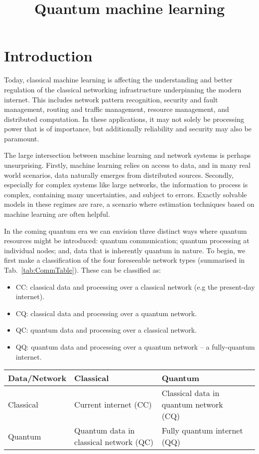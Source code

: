 \documentclass[twocolumn, aps, rmp, amsmath, amssymb, nofootinbib, superscriptaddress, longbibliography, floatfix, table-of-contents, eqsecnum]{revtex4}
\title{Quantum machine learning}\index{Quantum machine learning}\index{Machine learning}
\newcommand{\captionspacetab}[0]{\vspace{-0.6em}}
\begin{document}
\maketitle

\tableofcontents 

\section{Introduction}

Today, classical machine learning is affecting the understanding and better regulation of the classical networking infrastructure underpinning the modern internet. This includes network pattern recognition, security and fault management, routing and traffic management, resource management, and distributed computation. In these applications, it may not solely be processing power that is of importance, but additionally reliability and security may also be paramount.

The large intersection between machine learning and network systems is perhaps unsurprising. Firstly, machine learning relies on access to data, and in many real world scenarios, data naturally emerges from distributed sources. Secondly, especially for complex systems like large networks, the information to process is complex, containing many uncertainties, and subject to errors. Exactly solvable models in these regimes are rare, a scenario where estimation techniques based on machine learning are often helpful.

In the coming quantum era we can envision three distinct ways where quantum resources might be introduced: quantum communication; quantum processing at individual nodes; and, data that is inherently quantum in nature. To begin, we first make a classification of the four foreseeable network types (summarised in Tab.~\ref{tab:CommTable}). These can be classified as:

\begin{itemize}
\item CC: classical data and processing over a classical network (e.g the present-day internet).
\item CQ: classical data and processing over a quantum network.
\item QC: quantum data and processing over a classical network.
\item QQ: quantum data and processing over a quantum network -- a fully-quantum internet.
\end{itemize}

\begin{table*}[htbp!]
\begin{tabular}{|l|l|l|l|}
\hline
Data/Network & Classical & Quantum \\
\hline
\hline
Classical & Current internet (CC) & Classical data in quantum network (CQ) \\
Quantum & Quantum data in classical network (QC) & Fully quantum internet (QQ)\\
\hline
\end{tabular}
\captionspacetab \caption{\label{tab:CommTable}Classical and quantum data in a network.}
\end{table*}
\end{document}
